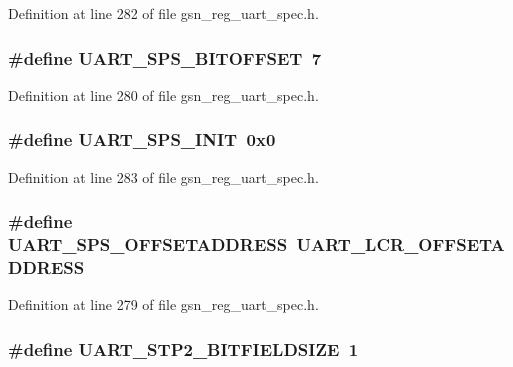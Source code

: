 Definition at line 282 of file gsn\_\-reg\_\-uart\_\-spec.h.

\hypertarget{a00575_a8b7dedbd461b903a619d56b2ed3fbb4f}{
\subsubsection[{UART\_\-SPS\_\-BITOFFSET}]{\setlength{\rightskip}{0pt plus 5cm}\#define UART\_\-SPS\_\-BITOFFSET~7}}
\label{a00575_a8b7dedbd461b903a619d56b2ed3fbb4f}


Definition at line 280 of file gsn\_\-reg\_\-uart\_\-spec.h.

\hypertarget{a00575_aad331dbe8199d67ee98dfdd06aba9bd1}{
\subsubsection[{UART\_\-SPS\_\-INIT}]{\setlength{\rightskip}{0pt plus 5cm}\#define UART\_\-SPS\_\-INIT~0x0}}
\label{a00575_aad331dbe8199d67ee98dfdd06aba9bd1}


Definition at line 283 of file gsn\_\-reg\_\-uart\_\-spec.h.

\hypertarget{a00575_a29dafda48460497ae59affbd6044d138}{
\subsubsection[{UART\_\-SPS\_\-OFFSETADDRESS}]{\setlength{\rightskip}{0pt plus 5cm}\#define UART\_\-SPS\_\-OFFSETADDRESS~UART\_\-LCR\_\-OFFSETADDRESS}}
\label{a00575_a29dafda48460497ae59affbd6044d138}


Definition at line 279 of file gsn\_\-reg\_\-uart\_\-spec.h.

\hypertarget{a00575_a00b092f3c050d58f442ea44500329729}{
\subsubsection[{UART\_\-STP2\_\-BITFIELDSIZE}]{\setlength{\rightskip}{0pt plus 5cm}\#define UART\_\-STP2\_\-BITFIELDSIZE~1}}
\label{a00575_a00b092f3c050d58f442ea44500329729}


